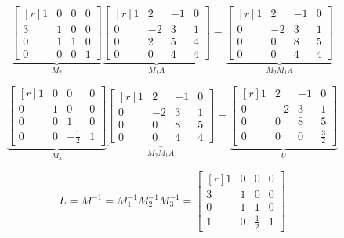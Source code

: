 \documentclass{jhwhw}
\begin{document}
\[
	\underbrace{\begin{bmatrix*}[r]
	  1     &    0    &     0   &  0 \\
	  3     &    1    &     0   &  0 \\
	  0     &    1    &     1   &  0 \\
	  0     &    0    &     0   &  1 
   \end{bmatrix*}}_{M_2}
   \underbrace{\begin{bmatrix*}[r]
	  1     &    2    &    -1   &  0 \\
	  0     &   -2    &     3   &  1 \\
	  0     &    2    &     5   &  4 \\
	  0     &    0    &     4   &  4 
	\end{bmatrix*}}_{M_1A}
	=
   \underbrace{\begin{bmatrix*}[r]
	  1     &    2    &    -1   &  0 \\
	  0     &   -2    &     3   &  1 \\
	  0     &    0    &     8   &  5 \\
	  0     &    0    &     4   &  4 
	\end{bmatrix*}}_{M_2M_1A}
\]

\[
	\underbrace{\begin{bmatrix*}[r]
	  1     &    0    &     0   &  0 \\
	  0     &    1    &     0   &  0 \\
	  0     &    0    &     1   &  0 \\
	  0     &    0    & -\frac{1}{2} &  1 
   \end{bmatrix*}}_{M_3}
   \underbrace{\begin{bmatrix*}[r]
	  1     &    2    &    -1   &  0 \\
	  0     &   -2    &     3   &  1 \\
	  0     &    0    &     8   &  5 \\
	  0     &    0    &     4   &  4 
	\end{bmatrix*}}_{M_2M_1A}
	=
   \underbrace{\begin{bmatrix*}[r]
	  1     &    2    &    -1   &  0 \\
	  0     &   -2    &     3   &  1 \\
	  0     &    0    &     8   &  5 \\
	  0     &    0    &     0   &  \frac{3}{2} 
	\end{bmatrix*}}_{U}
\]

\[
	L = M^{-1} = M_1^{-1} M_2^{-1} M_3^{-1}
	=
	\begin{bmatrix*}[r]
	  1     &    0    &     0   &  0 \\
	  3     &    1    &     0   &  0 \\
	  0     &    1    &     1   &  0 \\
	  1     &    0    &  \frac{1}{2}  & 1
	\end{bmatrix*}
\]
\end{document}
